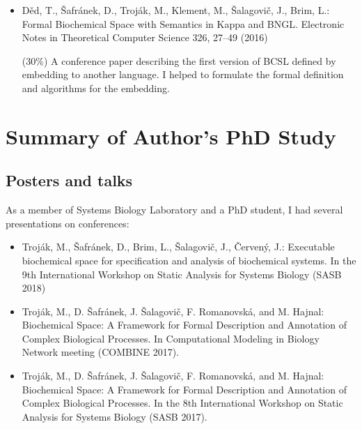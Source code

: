 \documentclass[11pt,a4paper]{report}
\newcounter{counter}[section]
\begin{document}
\begin{itemize}
(30\%) A tool paper presenting e-cyanobacterium.org as an instance of CMP. I helped with writing most of the text and brought several ideas to the web platform development.

\item Děd, T., Šafránek, D., Troják, M., Klement, M., Šalagovič, J., Brim, L.: Formal Biochemical Space with Semantics in Kappa and BNGL. Electronic Notes in Theoretical Computer Science 326, 27–49 (2016)

(30\%) A conference paper describing the first version of BCSL defined by embedding to another language. I helped to formulate the formal definition and algorithms for the embedding.

\end{itemize}

\newpage
{}





\appendix

\chapter{Summary of Author’s PhD Study}

\section{Posters and talks}

As a member of Systems Biology Laboratory and a PhD student, I had several presentations on conferences:

\begin{itemize}
 \item Troják, M., Šafránek, D., Brim, L., Šalagovič, J., Červený, J.: Executable biochemical space for specification and analysis of biochemical systems. In the 9th International Workshop on Static Analysis for Systems Biology (SASB 2018)
 \item Troják, M., D. Šafránek, J. Šalagovič, F. Romanovská, and M. Hajnal: Biochemical Space: A Framework for Formal Description and Annotation of Complex Biological Processes. In Computational Modeling in Biology Network meeting (COMBINE 2017).
 \item Troják, M., D. Šafránek, J. Šalagovič, F. Romanovská, and M. Hajnal: Biochemical Space: A Framework for Formal Description and Annotation of Complex Biological Processes. In the 8th International Workshop on Static Analysis for Systems Biology (SASB 2017).
\end{itemize}
\end{document}
